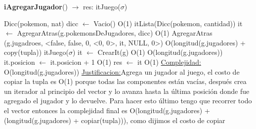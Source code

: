 \begin{Algoritmos}
\begin{algorithm}[H]{\textbf{iAgregarJugador}() $\to$ res: itJuego($\sigma$)}
	\begin{algorithmic}[1]
		\State Dicc(pokemon, nat) dicc $\gets$ Vacio() \Comment O(1)
		\State itLista(Dicc(pokemon, cantidad)) it $\gets$ AgregarAtras(g.pokemonsDeJugadores, dicc) \Comment O(1) 
		\State AgregarAtras (g.jugadroes, <false, false, 0, <0, 0>, it, NULL, 0>) \Comment O(longitud(g.jugadores) + copy(tupla))
		\State   itJuego($\sigma$) it $\gets$ CrearIt(g) \Comment O(1)
		 \Comment O(longitud(g.jugadores))
			\State it.posicion $\gets$ it.posicion + 1 \Comment O(1)
		\EndWhile
		\State res $\gets$ it \Comment O(1)
		\medskip
		\Statex \underline{Complejidad:} O(longitud(g.jugadores))
		\Statex \underline{Justificacion:}Agrega un jugador al juego, el costo de copiar la tupla es O(1) porque todas las componentes están vacías, después crea un iterador al principio del vector y lo avanza hasta la última posición donde fue agregado el jugador y lo devuelve. Para hacer esto último tengo que recorrer todo el vector entonces la complejidad final es O(longitud(g.jugadores) + (longitud(g.jugadores) + copiar(tupla))), como dijimos el costo de copiar  
	\end{algorithmic}
\end{algorithm}


\end{Algoritmos}

